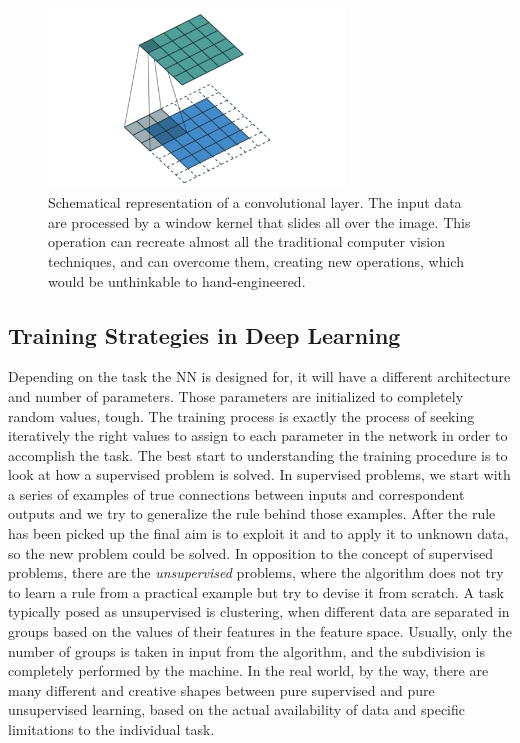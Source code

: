 \begin{figure}
    \centering
    \includegraphics[width = 0.7\textwidth]{images/CL}
    \caption{Schematical representation of a convolutional layer. The input data are processed by a window kernel that slides all over the image. This operation can recreate almost all the traditional computer vision techniques, and can overcome them, creating new operations, which would be unthinkable to hand-engineered.}
    \label{fig:convolutional}
\end{figure}

\subsection{Training Strategies in Deep Learning}
Depending on the task the NN is designed for, it will have a different architecture and number of parameters. Those parameters are initialized to completely random values, tough. The training process is exactly the process of seeking iteratively the right values to assign to each parameter in the network in order to accomplish the task. The best start to understanding the training procedure is to look at how a supervised problem is solved. In supervised problems, we start with a series of examples of true connections between inputs and correspondent outputs and we try to generalize the rule behind those examples. After the rule has been picked up the final aim is to exploit it and to apply it to unknown data, so the new problem could be solved. In opposition to the concept of supervised problems, there are the \textit{unsupervised} problems, where the algorithm does not try to learn a rule from a practical example but try to devise it from scratch. A task typically posed as unsupervised is clustering, when different data are separated in groups based on the values of their features in the feature space. Usually, only the number of groups is taken in input from the algorithm, and the subdivision is completely performed by the machine. In the real world, by the way, there are many different and creative shapes between pure supervised and pure unsupervised learning, based on the actual availability of data and specific limitations to the individual task.

